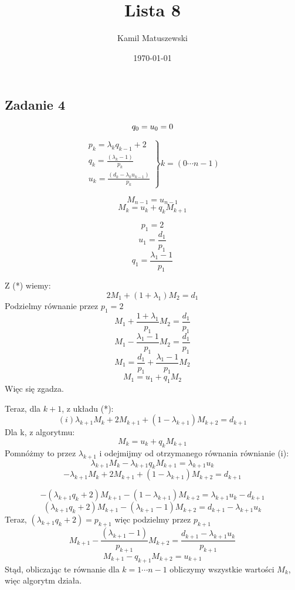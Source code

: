 \documentclass[a4paper]{article}
\title{Lista 8}
\author{Kamil Matuszewski}
\date{\today}
\begin{document}
\maketitle
\setlength{\parindent}{0.5ex}
\setlength{\parskip}{1.5ex}

\subsection*{Zadanie 4}

$$q_0 = u_0 = 0\\$$

$$\left.\begin{matrix}
p_k=\lambda_k q_{k-1} + 2\\ 
q_k = \frac{(\lambda_k - 1)}{p_k}\\ 
u_k=\frac{(d_k - \lambda_k u_{k-1})}{p_k}
\end{matrix}\right\} k=(0\cdots n-1)$$

$$M_{n-1} = u_{n-1}$$
$$M_k = u_k + q_k M_{k+1} $$

$$p_1=2$$
$$u_1=\frac{d_1}{p_1}$$
$$q_1=\frac{\lambda_1 - 1}{p_1} $$

Z (*) wiemy:\\
$$2M_1 + (1+\lambda_1)M_2 = d_1$$
Podzielmy równanie przez $p_1=2$\\
$$M_1 + \frac{1+\lambda_1}{p_1}M_2 = \frac{d_1}{p_1} $$
$$M_1 - \frac{\lambda_1 - 1}{p_1}M_2 = \frac{d_1}{p_1} $$
$$M_1 = \frac{d_1}{p_1} + \frac{\lambda_1 - 1}{p_1}M_2 $$
$$M_1 = u_1 + q_1 M_2$$
Więc się zgadza.

Teraz, dla $k+1$, z układu (*):\\
$$(i)\lambda_{k+1} M_k + 2M_{k+1} + (1-\lambda_{k+1})M_{k+2} = d_{k+1}$$
Dla k, z algorytmu:\\
$$M_k = u_k + q_k M_{k+1}$$
Pomnóżmy to przez $\lambda_{k+1}$ i odejmijmy od otrzymanego równania równianie (i):\\
$$\lambda_{k+1}M_k - \lambda_{k+1} q_k M_{k+1} = \lambda_{k+1} u_k$$
$$- \lambda_{k+1} M_k + 2M_{k+1} + (1-\lambda_{k+1})M_{k+2} = d_{k+1}$$

$$-(\lambda_{k+1} q_k + 2) M_{k+1} - (1-\lambda_{k+1})M_{k+2}=  \lambda_{k+1} u_k - d_{k+1}$$
$$(\lambda_{k+1} q_k + 2) M_{k+1} - (\lambda_{k+1} - 1)M_{k+2}= d_{k+1} - \lambda_{k+1} u_k$$
Teraz, $(\lambda_{k+1} q_k + 2) = p_{k+1}$ więc podzielmy przez $p_{k+1}$
$$M_{k+1} - \frac{(\lambda_{k+1} - 1)}{p_{k+1}}M_{k+2} = \frac{d_{k+1} - \lambda_{k+1} u_k}{p_{k+1}} $$
$$M_{k+1} - q_{k+1}M_{k+2} = u_{k+1} $$
Stąd, obliczając te równanie dla $k=1\cdots n-1$ obliczymy wszystkie wartości $M_k$, więc algorytm działa.
\end{document}
